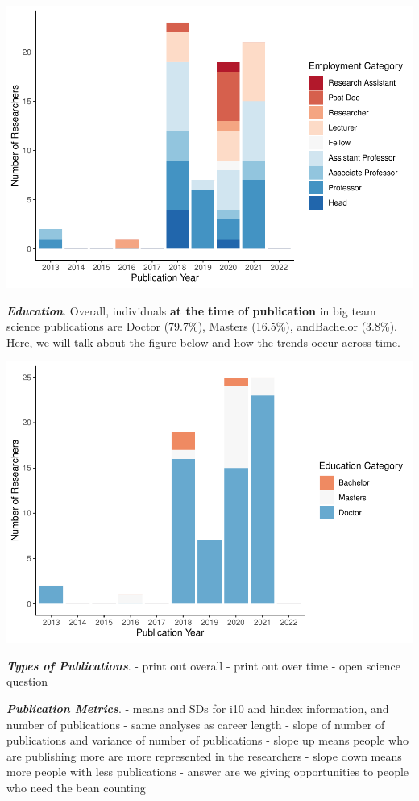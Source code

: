 \documentclass[
  english,
  man]{apa6}
\begin{document}
\includegraphics{04.manuscript_files/figure-latex/figure3-1.pdf}

\textbf{\emph{Education}}. Overall, individuals \textbf{at the time of publication} in big team science publications are Doctor (79.7\%), Masters (16.5\%), andBachelor (3.8\%). Here, we will talk about the figure below and how the trends occur across time.

\includegraphics{04.manuscript_files/figure-latex/figure4-1.pdf}

\textbf{\emph{Types of Publications}}.
- print out overall
- print out over time
- open science question

\textbf{\emph{Publication Metrics}}.
- means and SDs for i10 and hindex information, and number of publications
- same analyses as career length - slope of number of publications and variance of number of publications
- slope up means people who are publishing more are more represented in the researchers
- slope down means more people with less publications
- answer are we giving opportunities to people who need the bean counting
\end{document}
